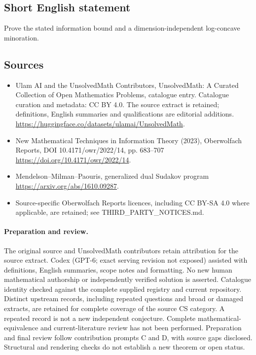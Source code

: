 \documentclass[11pt]{article}
\begin{document}
\subsection{Short English statement}
Prove the stated information bound and a dimension-independent log-concave minoration.
\subsection{Sources}
\begin{itemize}
\item[\hypertarget{source:statement:1}{S1}] Ulam AI and the UnsolvedMath Contributors, UnsolvedMath: A Curated Collection of Open Mathematics Problems, catalogue entry. Catalogue curation and metadata: CC BY 4.0. The source extract is retained; definitions, English summaries and qualifications are editorial additions.
\url{https://huggingface.co/datasets/ulamai/UnsolvedMath}.
\item[\hypertarget{source:statement:2}{S2}] New Mathematical Techniques in Information Theory (2023), Oberwolfach Reports, DOI 10.4171/owr/2022/14, pp. 683--707
\url{https://doi.org/10.4171/owr/2022/14}.
\item[\hypertarget{source:statement:3}{S3}] Mendelson--Milman--Paouris, generalized dual Sudakov program
\url{https://arxiv.org/abs/1610.09287}.
\item Source-specific Oberwolfach Reports licences, including CC BY-SA 4.0 where applicable, are retained; see THIRD\_PARTY\_NOTICES.md.
\end{itemize}
\paragraph{Preparation and review.}
The original source and UnsolvedMath contributors retain attribution for the source extract. Codex (GPT-6; exact serving revision not exposed) assisted with definitions, English summaries, scope notes and formatting. No new human mathematical authorship or independently verified solution is asserted. Catalogue identity checked against the complete supplied registry and current repository. Distinct upstream records, including repeated questions and broad or damaged extracts, are retained for complete coverage of the source CS category. A repeated record is not a new independent conjecture. Complete mathematical-equivalence and current-literature review has not been performed. Preparation and final review follow contribution prompts C and D, with source gaps disclosed. Structural and rendering checks do not establish a new theorem or open status.
\label{end:statement}
\end{document}
